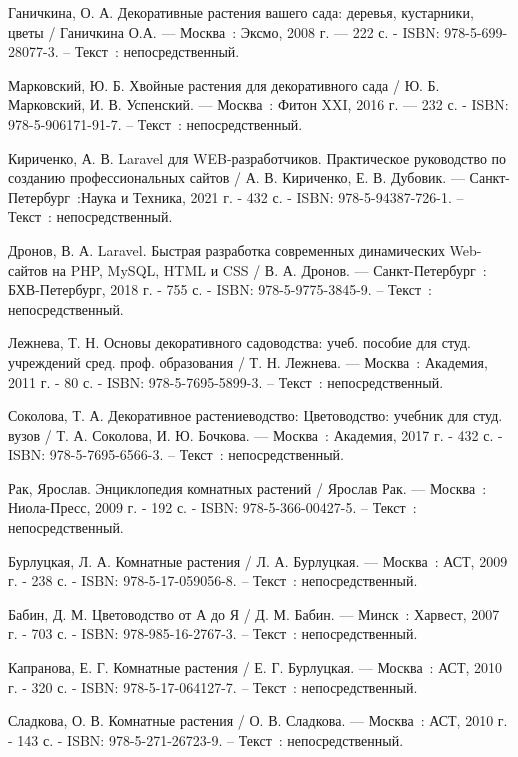 \begin{thebibliography}{9}
	 Ганичкина, О. А. Декоративные растения вашего сада: деревья, кустарники, цветы / Ганичкина О.А. —  Москва~: Эксмо, 2008 г. —  222 с. - ISBN: 978-5-699-28077-3. – Текст~: непосредственный.
	
	 Марковский, Ю. Б. Хвойные растения для декоративного сада / Ю. Б. Марковский, И. В. Успенский. — Москва~: Фитон XXI, 2016 г. — 232 с. - ISBN: 978-5-906171-91-7. – Текст~: непосредственный.
	
	 Кириченко, А. В. Laravel для WEB-разработчиков. Практическое руководство по созданию профессиональных сайтов / А. В. Кириченко, Е. В. Дубовик. — Санкт-Петербург~:Наука и Техника, 2021 г. - 432 с. - ISBN: 
	978-5-94387-726-1. – Текст~: непосредственный.
	
	 Дронов, В. А. Laravel. Быстрая разработка современных динамических Web-сайтов на PHP, MySQL, HTML и CSS / В. А. Дронов. — Санкт-Петербург~: БХВ-Петербург, 2018 г. - 755 с. - ISBN: 978-5-9775-3845-9. – Текст~: непосредственный.
	
	
	 Лежнева, Т. Н. Основы декоративного садоводства: учеб. пособие для студ. учреждений сред. проф. образования / Т. Н. Лежнева. — Москва~: Академия, 2011 г. - 80 с. - ISBN: 978-5-7695-5899-3. – Текст~: непосредственный.
	
	 Соколова, Т. А. Декоративное растениеводство: Цветоводство: учебник для студ. вузов / Т. А. Соколова, И. Ю. Бочкова. — Москва~: Академия, 2017 г. - 432 с. - ISBN: 978-5-7695-6566-3. – Текст~: непосредственный.
	
	 Рак, Ярослав. Энциклопедия комнатных растений / Ярослав Рак. — Москва~: Ниола-Пресс, 2009 г. - 192 с. - ISBN: 978-5-366-00427-5. – Текст~: непосредственный.
	
	 Бурлуцкая, Л. А. Комнатные растения / Л. А. Бурлуцкая. — Москва~: АСТ, 2009 г. - 238 с. - ISBN: 978-5-17-059056-8. – Текст~: непосредственный.
	
	 Бабин, Д. М. Цветоводство от А до Я / Д. М. Бабин. — Минск~: Харвест, 2007 г. - 703 с. - ISBN: 978-985-16-2767-3. – Текст~: непосредственный.
	
	 Капранова, Е. Г. Комнатные растения / Е. Г. Бурлуцкая. — Москва~: АСТ, 2010 г. - 320 с. - ISBN: 978-5-17-064127-7. – Текст~: непосредственный.
	
	 Сладкова, О. В. Комнатные растения / О. В. Сладкова. — Москва~: АСТ, 2010 г. - 143 с. - ISBN: 978-5-271-26723-9. – Текст~: непосредственный.
	

\end{thebibliography}
